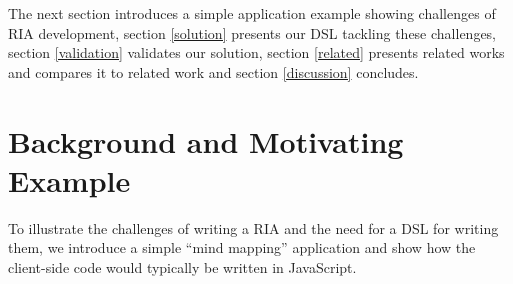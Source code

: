 \documentclass[american,english,runningheads]{llncs}
\begin{document}
% 
% 
% 
% 
% 
% 

The next section introduces a simple application example showing challenges of RIA development, section
\ref{solution} presents our DSL tackling these challenges, section \ref{validation} validates our solution, section
\ref{related} presents related works and compares it to related work and section \ref{discussion} concludes.


\section{Background and Motivating Example}
\label{problem}

To illustrate the challenges of writing a RIA and the need for a DSL for writing them, we introduce a simple “mind
mapping” application and show how the client-side code would typically be written in JavaScript.
\end{document}
